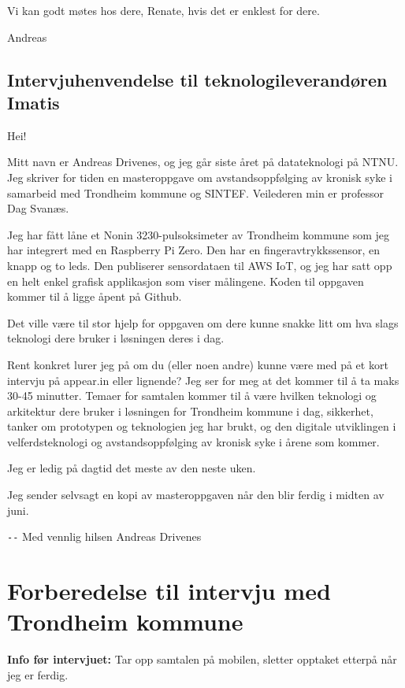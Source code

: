 Vi kan godt møtes hos dere, Renate, hvis det er enklest for dere.

Andreas

\section{Intervjuhenvendelse til teknologileverandøren Imatis}
Hei! 

Mitt navn er Andreas Drivenes, og jeg går siste året på datateknologi på NTNU. Jeg skriver for tiden en masteroppgave
om avstandsoppfølging av kronisk syke i samarbeid med Trondheim kommune og SINTEF. Veilederen min er professor Dag Svanæs.

Jeg har fått låne et Nonin 3230-pulsoksimeter av Trondheim kommune som jeg har integrert med en Raspberry Pi Zero.
Den har en fingeravtrykkssensor, en knapp og to leds. Den publiserer sensordataen til AWS IoT, og jeg har satt opp en helt
enkel grafisk applikasjon som viser målingene. Koden til oppgaven kommer til å ligge åpent på Github.

Det ville være til stor hjelp for oppgaven om dere kunne snakke litt om hva slags teknologi dere bruker i løsningen deres i dag.

Rent konkret lurer jeg på om du (eller noen andre) kunne være med på et kort intervju på appear.in eller lignende? 
Jeg ser for meg at det kommer til å ta maks 30-45 minutter. Temaer for samtalen kommer til å være hvilken teknologi og arkitektur
dere bruker i løsningen for Trondheim kommune i dag, sikkerhet, tanker om prototypen og teknologien jeg har brukt, og den
digitale utviklingen i velferdsteknologi og avstandsoppfølging av kronisk syke i årene som kommer.

Jeg er ledig på dagtid det meste av den neste uken.

Jeg sender selvsagt en kopi av masteroppgaven når den blir ferdig i midten av juni.

\verb|--| \newline
Med vennlig hilsen \newline
Andreas Drivenes \newline

\chapter{Forberedelse til intervju med Trondheim kommune}
\label{appendix:forberedelse}
\textbf{Info før intervjuet:}
Tar opp samtalen på mobilen, sletter opptaket etterpå når jeg er ferdig. 
 
